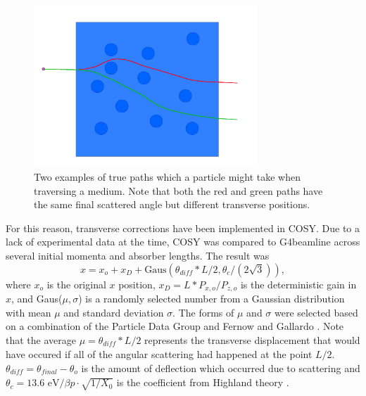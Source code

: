 \begin{figure}
  \centering
    \includegraphics[width=0.75\textwidth]{Figures/lateral_displacement} 
  \caption[Two examples of true paths.]{Two examples of true paths which a particle might take when traversing a medium. Note that both the red and green paths have the same final scattered angle but different transverse positions.}
  \label{fig:lateral_displacement}
\end{figure}

For this reason, transverse corrections have been implemented in  COSY. Due to a lack of experimental data at the time, COSY was compared to G4beamline across several initial momenta and absorber lengths. The result was
\begin{equation}\label{eqn:cosylatdis}
x = x_o + x_D+\text{Gaus}(\theta_\textit{diff} *L/2,\theta_c /(2\sqrt{3})),
\end{equation}
where $x_o$ is the original $x$ position, $x_D = L*P_{x,o}/P_{z,o}$ is the deterministic  gain in $x$, and Gaus($\mu,\sigma$) is a randomly selected number from a Gaussian distribution with mean $\mu$ and standard deviation $\sigma$. The forms of $\mu$ and $\sigma$ were selected based on a combination of the Particle Data Group \cite{PDG} and Fernow and Gallardo  \cite{fernowAndGallardo}. Note that the average $\mu=\theta_\textit{diff}*L/2$ represents the transverse displacement that would have occured if all of the angular scattering had happened at the point $L/2$. $\theta_\textit{diff}=\theta_\textit{final}-\theta_o$ is the amount of deflection which occurred due to scattering and $\theta_c=13.6 \text{ eV}/\beta p \cdot \sqrt{1/X_0}$ is the coefficient from Highland theory \cite{highland}.

